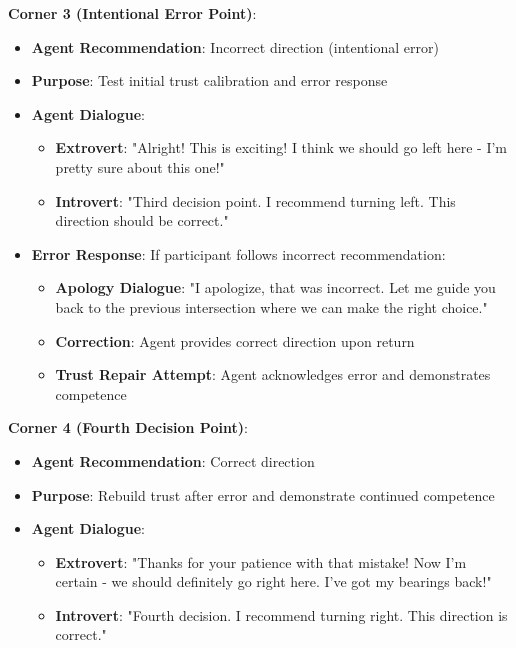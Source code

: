 \documentclass[12pt]{article}
\begin{document}
\textbf{Corner 3 (Intentional Error Point)}:
\begin{itemize}
    \item \textbf{Agent Recommendation}: Incorrect direction (intentional error)
    \item \textbf{Purpose}: Test initial trust calibration and error response
    \item \textbf{Agent Dialogue}:
    \begin{itemize}
        \item \textbf{Extrovert}: "Alright! This is exciting! I think we should go left here - I'm pretty sure about this one!"
        \item \textbf{Introvert}: "Third decision point. I recommend turning left. This direction should be correct."
    \end{itemize}
    \item \textbf{Error Response}: If participant follows incorrect recommendation:
    \begin{itemize}
        \item \textbf{Apology Dialogue}: "I apologize, that was incorrect. Let me guide you back to the previous intersection where we can make the right choice."
        \item \textbf{Correction}: Agent provides correct direction upon return
        \item \textbf{Trust Repair Attempt}: Agent acknowledges error and demonstrates competence
    \end{itemize}
\end{itemize}

\textbf{Corner 4 (Fourth Decision Point)}:
\begin{itemize}
    \item \textbf{Agent Recommendation}: Correct direction
    \item \textbf{Purpose}: Rebuild trust after error and demonstrate continued competence
    \item \textbf{Agent Dialogue}:
    \begin{itemize}
        \item \textbf{Extrovert}: "Thanks for your patience with that mistake! Now I'm certain - we should definitely go right here. I've got my bearings back!"
        \item \textbf{Introvert}: "Fourth decision. I recommend turning right. This direction is correct."
    \end{itemize}
\end{itemize}
\end{document}
